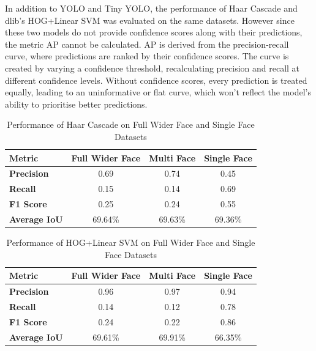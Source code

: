In addition to YOLO and Tiny YOLO, the performance of Haar Cascade and dlib’s HOG+Linear SVM was evaluated on the same datasets. However since these two models do not provide confidence scores along with their predictions, the metric AP cannot be calculated. AP is derived from the precision-recall curve, where predictions are ranked by their confidence scores. The curve is created by varying a confidence threshold, recalculating precision and recall at different confidence levels. Without confidence scores, every prediction is treated equally, leading to an uninformative or flat curve, which won't reflect the model's ability to prioritise better predictions.

\begin{table}[h!]
\centering
\caption{Performance of Haar Cascade on Full Wider Face and Single Face Datasets}
\begin{tabular}{|l|c|c|c|}
\hline
\textbf{Metric}      & \textbf{Full Wider Face} & \textbf{Multi Face}  & \textbf{Single Face} \\ \hline
\textbf{Precision}   & 0.69      &  0.74           & 0.45               \\ \hline
\textbf{Recall}      & 0.15      &  0.14           & 0.69               \\ \hline
\textbf{F1 Score}    & 0.25      &  0.24           & 0.55               \\ \hline
\textbf{Average IoU} & 69.64\%     &  69.63\%           & 69.36\%              \\ \hline
\end{tabular}
\label{tab:HAAR}
\end{table}

\begin{table}[h!]
\centering
\caption{Performance of HOG+Linear SVM on Full Wider Face and Single Face Datasets}
\begin{tabular}{|l|c|c|c|}
\hline
\textbf{Metric}      & \textbf{Full Wider Face} & \textbf{Multi Face}  & \textbf{Single Face} \\ \hline
\textbf{Precision}   & 0.96       & 0.97           & 0.94               \\ \hline
\textbf{Recall}      & 0.14       & 0.12           & 0.78               \\ \hline
\textbf{F1 Score}    & 0.24       & 0.22           & 0.86               \\ \hline
\textbf{Average IoU} & 69.61\%      & 69.91\%           & 66.35\%              \\ \hline
\end{tabular}
\label{tab:HOGSVM}
\end{table}

